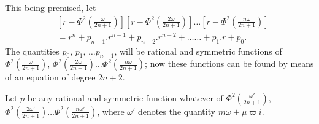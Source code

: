 \documentclass{article}
\begin{document}

This being premised, let
\[ \begin{aligned}
&\left[r-\Phi^{2}\left(\frac{\omega}{2n+1}\right)\right]\left[r-\Phi^{2}\left(\frac{2\omega}{2n+1}\right)\right]\ldots\left[r-\Phi^{2}\left(\frac{n\omega}{2n+1}\right)\right]\\
&=r^{n}+p_{n-1}.r^{n-1}+p_{n-2}.r^{n-2}+\ldots\ldots+p_{1}.r+p_{0}.
\end{aligned} \tag{93.} \]
The quantities $p_{0}$, $p_{1}$, $\ldots p_{n-1}$, will be rational and symmetric functions of $\Phi^{2}\left(\frac{\omega}{2n+1}\right)$, $\Phi^{2}\left(\frac{2\omega}{2n+1}\right)\ldots\Phi^{2}\left(\frac{n\omega}{2n+1}\right)$; now these functions can be found by means of an equation of degree $2n+2$.

Let $p$ be any rational and symmetric function whatever of $\Phi^{2}\left(\frac{\omega'}{2n+1}\right)$, $\Phi^{2}\left(\frac{2\omega'}{2n+1}\right)\ldots\Phi^{2}\left(\frac{n\omega'}{2n+1}\right)$, where $\omega'$ denotes the quantity $m\omega+\mu\varpi i$.
\end{document}
